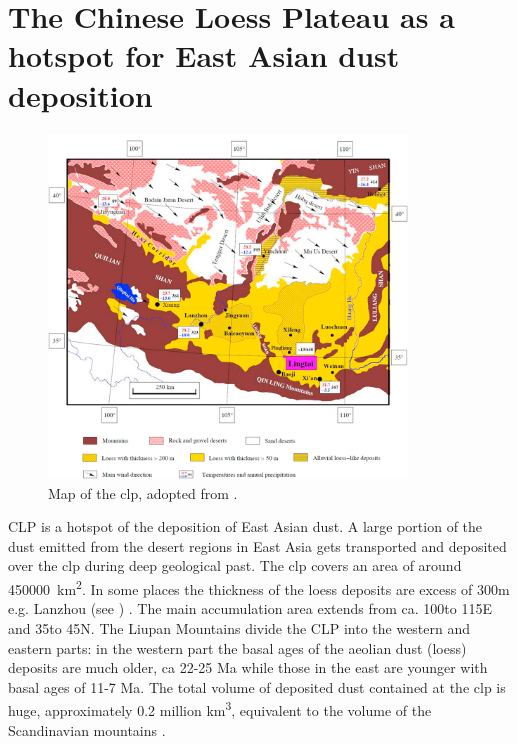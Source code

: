 \section{The Chinese Loess Plateau as a hotspot for East Asian dust deposition}
\begin{figure}[htpb]

        \centering
        \includegraphics[width=0.85\textwidth]{texfiles/figs/loess_plateau_maps.jpg}
        

    \caption{Map of the \acrshort{clp}, adopted from \textcite{spassov2002loess}.}
    \label{fig:map_clp}
\end{figure}

CLP is a hotspot of the deposition of East Asian dust. A large portion of the dust emitted from the desert regions in East Asia gets transported and deposited over the \acrshort{clp} during deep geological past. 
The \acrshort{clp} covers an area of around \SI{450000}{\square\km}. In some places the thickness of the loess deposits are excess of 300m e.g. Lanzhou (see ) \parencite{an2014cenozoicChange}. 
The main accumulation area extends from ca. 100\degree to 115\degree E and 35\degree to 45\degree N. The Liupan Mountains divide the CLP into the western and eastern parts: in the western part the basal ages of the aeolian dust (loess) deposits are much older, ca 22-25 Ma \parencite{qiang2011new} while those in the east are younger with basal ages of 11-7  Ma.
The total volume of deposited dust contained at the \acrshort{clp} is huge, approximately 0.2 million \si{\cubic\km}, equivalent to the volume of the Scandinavian mountains
\parencite{maher2016palaeoclimatic}.  

